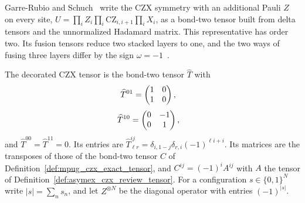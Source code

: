Garre-Rubio and Schuch~\cite[Section~III.D]{GarreRubioSchuch2024DomainWall}
write the CZX symmetry with an additional Pauli $Z$ on every site,
$U=\prod_iZ_i\prod_i\mathrm{CZ}_{i,i+1}\prod_iX_i$, as a bond-two tensor built
from delta tensors and the unnormalized Hadamard matrix. This
representative has order two. Its fusion tensors reduce two stacked
layers to one, and the two ways of fusing three layers differ by the sign
$\omega=-1$~\cite[Section~III.A]{GarreRubioSchuch2024DomainWall}.

\begin{definition}
    \label{def:asymex_czx_decorated_tensor}
    \leanok
    The decorated CZX tensor is the bond-two tensor $\widehat T$ with
    \begin{align}
        \widehat T^{01} & =\begin{pmatrix}1&0\\1&0\end{pmatrix},
        \notag
    \end{align}
    \begin{align}
        \widehat T^{10} & =\begin{pmatrix}0&-1\\0&1\end{pmatrix},
        \notag
    \end{align}
    and $\widehat T^{00}=\widehat T^{11}=0$. Its entries are
    $\widehat T^{ij}_{\ell r}=\delta_{i,1-j}\delta_{r,i}(-1)^{\ell i+i}$. Its
    matrices are the transposes of those of the bond-two tensor $C$ of
    Definition~\ref{def:mpug_czx_exact_tensor}, and
    $C^{ij}=(-1)^iA^{ij}$ with $A$ the tensor of
    Definition~\ref{def:asymex_czx_review_tensor}. For a configuration
    $s\in\{0,1\}^N$ write $|s|=\sum_ns_n$, and let $Z^{\otimes N}$ be the
    diagonal operator with entries $(-1)^{|s|}$.
\end{definition}

